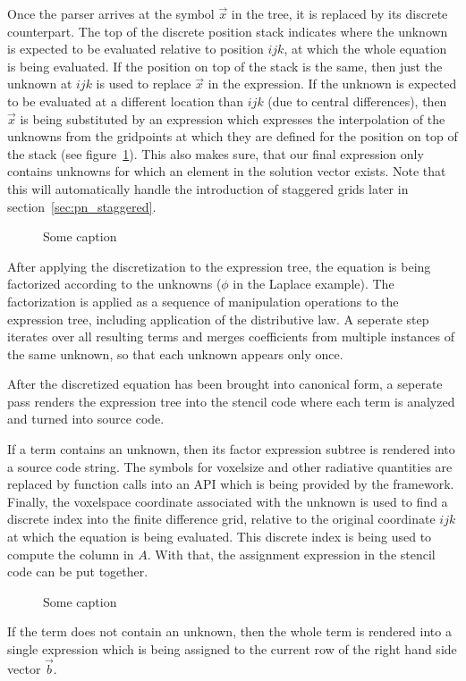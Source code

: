 Once the parser arrives at the symbol $\vec{x}$ in the tree, it is replaced by its discrete counterpart. The top of the discrete position stack indicates where the unknown is expected to be evaluated relative to position $ijk$, at which the whole equation is being evaluated. If the position on top of the stack is the same, then just the unknown at $ijk$ is used to replace $\vec{x}$ in the expression. If the unknown is expected to be evaluated at a different location than $ijk$ (due to central differences), then $\vec{x}$ is being substituted by an expression which expresses the interpolation of the unknowns from the gridpoints at which they are defined for the position on top of the stack (see figure~\ref{fig:pn_discretization_interpolation}). This also makes sure, that our final expression only contains unknowns for which an element in the solution vector exists. Note that this will automatically handle the introduction of staggered grids later in section~\ref{sec:pn_staggered}.
\begin{figure}[h]
\centering
{}
\caption{Some caption}
\label{fig:pn_discretization_interpolation}
\end{figure}

After applying the discretization to the expression tree, the equation is being factorized according to the unknowns ($\phi$ in the Laplace example). The factorization is applied as a sequence of manipulation operations to the expression tree, including application of the distributive law. A seperate step iterates over all resulting terms and merges coefficients from multiple instances of the same unknown, so that each unknown appears only once. 

After the discretized equation has been brought into canonical form, a seperate pass renders the expression tree into the stencil code where each term is analyzed and turned into source code.

If a term contains an unknown, then its factor expression subtree is rendered into a source code string. The symbols for voxelsize and other radiative quantities are replaced by function calls into an API which is being provided by the framework. Finally, the voxelspace coordinate associated with the unknown is used to find a discrete index into the finite difference grid, relative to the original coordinate $ijk$ at which the equation is being evaluated. This discrete index is being used to compute the column in $A$. With that, the assignment expression in the stencil code can be put together.
\begin{figure}[h]
\centering
{}
\caption{Some caption}
\label{fig:pn_discretization_codegen}
\end{figure}
If the term does not contain an unknown, then the whole term is rendered into a single expression which is being assigned to the current row of the right hand side vector $\vec{b}$.

